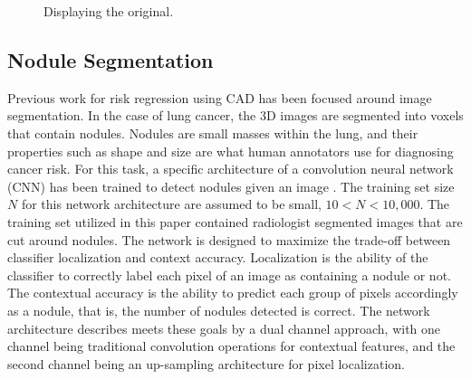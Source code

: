 \documentclass[conference,11pt]{IEEEtran}
\begin{document}
\begin{figure}
    \centering
    	\hspace{0.02\linewidth}
      \caption{Displaying the original.}
      \label{fig:elephant}
\end{figure}

\subsection{Nodule Segmentation}

Previous work for risk regression using CAD has been focused around image segmentation. In the case of lung cancer, the 3D images are segmented into voxels that contain nodules. Nodules are small masses within the lung, and their properties such as shape and size are what human annotators use for diagnosing cancer risk. For this task, a specific architecture of a convolution neural network (CNN) has been trained to detect nodules given an image \cite{ronneberger_u-net:_2015}. The training set size $N$ for this network architecture are assumed to be small, $10 < N < 10,000$. The training set utilized in this paper contained radiologist segmented images that are cut around nodules. The network is designed to maximize the trade-off between classifier localization and context accuracy. Localization is the ability of the classifier to correctly label each pixel of an image as containing a nodule or not. The contextual accuracy is the ability to predict each group of pixels accordingly as a nodule, that is, the number of nodules detected is correct. The network architecture describes meets these goals by a dual channel approach, with one channel being traditional convolution operations for contextual features, and the second channel being an up-sampling architecture for pixel localization.
\end{document}
